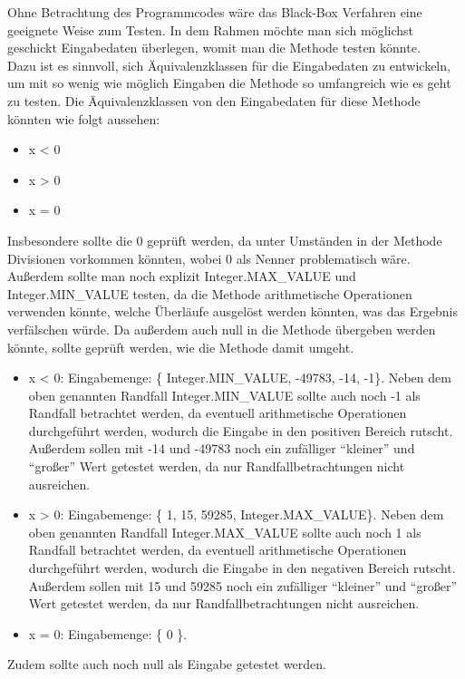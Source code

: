 Ohne Betrachtung des Programmcodes wäre das Black-Box Verfahren eine geeignete Weise zum Testen. In dem Rahmen möchte man sich möglichst
geschickt Eingabedaten überlegen, womit man die Methode testen könnte.\\
Dazu ist es sinnvoll, sich Äquivalenzklassen für die Eingabedaten zu entwickeln, um mit so wenig wie möglich Eingaben die Methode so umfangreich
wie es geht zu testen. Die Äquivalenzklassen von den Eingabedaten für diese Methode könnten wie folgt aussehen:
\begin{itemize}
    \item x < 0
    \item x > 0
    \item x = 0
\end{itemize}
Insbesondere sollte die 0 geprüft werden, da unter Umständen in der Methode Divisionen vorkommen könnten, wobei 0 als Nenner problematisch wäre.
Außerdem sollte man noch explizit Integer.MAX\_VALUE und Integer.MIN\_VALUE testen, da die Methode arithmetische Operationen verwenden könnte, welche
Überläufe ausgelöst werden könnten, was das Ergebnis verfälschen würde. Da außerdem auch null in die Methode übergeben werden könnte, sollte geprüft
werden, wie die Methode damit umgeht.


\begin{itemize}
    \item x < 0: Eingabemenge: \{ Integer.MIN\_VALUE, -49783, -14, -1\}. Neben dem oben genannten Randfall Integer.MIN\_VALUE sollte auch noch -1 als Randfall
        betrachtet werden, da eventuell arithmetische Operationen durchgeführt werden, wodurch die Eingabe in den positiven Bereich rutscht. Außerdem sollen
        mit -14 und -49783 noch ein zufälliger ``kleiner'' und ``großer'' Wert getestet werden, da nur Randfallbetrachtungen nicht ausreichen.
    \item x > 0: Eingabemenge: \{ 1, 15, 59285, Integer.MAX\_VALUE\}. Neben dem oben genannten Randfall Integer.MAX\_VALUE sollte auch noch 1 als Randfall
        betrachtet werden, da eventuell arithmetische Operationen durchgeführt werden, wodurch die Eingabe in den negativen Bereich rutscht. Außerdem sollen
        mit 15 und 59285 noch ein zufälliger ``kleiner'' und ``großer'' Wert getestet werden, da nur Randfallbetrachtungen nicht ausreichen.
    \item x = 0: Eingabemenge: \{ 0 \}.
\end{itemize}
Zudem sollte auch noch null als Eingabe getestet werden.